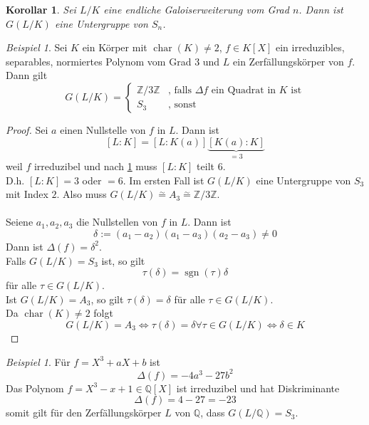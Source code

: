 \documentclass[10pt,a4paper]{article}
\newcommand{\Z}{\ensuremath{\mathbb{Z}}}
\newcommand{\Q}{\ensuremath{\mathbb{Q}}}
\newcommand{\cha}{\operatorname{char}}
\newcommand{\isom}{\overset{\sim}{=}}
\theoremstyle{plain}
\newtheorem{kor}[theorem]{Korollar}
\theoremstyle{definition}
\theoremstyle{remark}
\newtheorem{exm}[theorem]{Beispiel}
\begin{document}
	\begin{kor}\label{04korTeilbarkeit}
		Sei $L/K$ eine endliche Galoiserweiterung vom Grad $n$. Dann ist $G(L/K)$ eine Untergruppe von $S_n$.
	\end{kor}

	\begin{exm}
		Sei $K$ ein Körper mit $\cha(K)\neq 2$, $f\in K[X]$ ein irreduzibles, separables, normiertes Polynom vom Grad $3$ und $L$ ein Zerfällungskörper von $f$. Dann gilt
		\[G(L/K)=\begin{cases}
		\Z/3\Z&\text{, falls $\Delta f$ ein Quadrat in $K$ ist}\\
		S_3&\text{, sonst}
		\end{cases}\]
	\end{exm}
	\begin{proof}
		Sei $a$ einen Nullstelle von $f$ in $L$. Dann ist
		\[[L:K]=[L:K(a)]\underbrace{[K(a):K]}_{=3}\]
		weil $f$ irreduzibel und nach \ref{04korTeilbarkeit} muss $[L:K]$ teilt $6$.\\
		D.h. $[L:K]=3$ oder $=6$. Im ersten Fall ist $G(L/K)$ eine Untergruppe von $S_3$ mit Index $2$. Also muss $G(L/K)\isom A_3\isom\Z/3\Z$.\\
		\\
		Seiene $a_1,a_2,a_3$ die Nullstellen von $f$ in $L$. Dann ist
		\[\delta:=(a_1-a_2)(a_1-a_3)(a_2-a_3)\neq 0\]
		Dann ist $\Delta(f)=\delta^2$.\\
		Falls $G(L/K)=S_3$ ist, so gilt
		\[\tau(\delta)=\operatorname{sgn}(\tau)\delta\]
		für alle $\tau\in G(L/K)$.\\
		Ist $G(L/K)=A_3$, so gilt $\tau(\delta)=\delta$ für alle $\tau\in G(L/K)$.\\
		Da $\cha(K)\neq 2$ folgt
		\[G(L/K)=A_3\Leftrightarrow\tau(\delta)=\delta\forall\tau\in G(L/K)\Leftrightarrow\delta\in K\]
	\end{proof}

	\begin{exm}
		Für $f=X^3+aX+b$ ist
		\[\Delta(f)=-4a^3-27b^2\]
		Das Polynom $f=X^3-x+1\in\Q[X]$ ist irreduzibel und hat Diskriminante 
		\[\Delta(f)=4-27=-23\]
		somit gilt für den Zerfällungskörper $L$ von $\Q$, dass $G(L/\Q)=S_3$.
	\end{exm}
\end{document}
